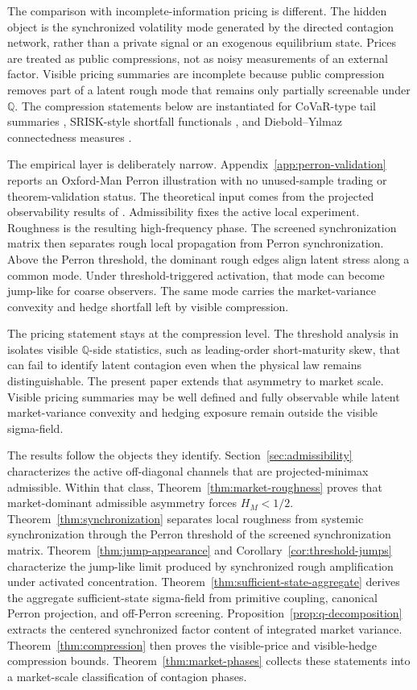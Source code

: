 \documentclass[11pt,a4paper]{amsart}
\theoremstyle{plain}
\theoremstyle{definition}
\theoremstyle{remark}
\newcommand{\QQ}{\mathbb{Q}}
\begin{document}
The comparison with incomplete-information pricing is different.  The hidden object is the
synchronized volatility mode generated by the directed contagion network, rather than a private
signal or an exogenous equilibrium state.  Prices are treated as public compressions, not as noisy
measurements of an external factor.  Visible pricing summaries are incomplete because public
compression removes part of a latent rough mode that remains only partially screenable under
\(\QQ\).  The compression statements
below are instantiated for CoVaR-type tail summaries \cite{adrian2016covar}, SRISK-style shortfall
functionals \cite{brownlees2017srisk}, and Diebold--Y\i lmaz connectedness measures
\cite{diebold2009spillovers,diebold2014connectedness}.

The empirical layer is deliberately narrow.  Appendix~\ref{app:perron-validation} reports an
Oxford-Man Perron illustration with no unused-sample trading or theorem-validation status.  The
theoretical input comes from the projected observability results of \cite{vidal2026econometric}.  Admissibility fixes the active local experiment.  Roughness is the
resulting high-frequency phase.  The screened synchronization matrix then separates rough local
propagation from Perron synchronization.  Above the Perron threshold, the dominant rough edges align
latent stress along a common mode.  Under threshold-triggered activation, that mode can become
jump-like for coarse observers.  The same mode carries the market-variance convexity and hedge
shortfall left by visible compression.

The pricing statement stays at the compression level.  The threshold analysis in
\cite{vidal2026latent} isolates visible \(\QQ\)-side statistics, such as leading-order
short-maturity skew, that can fail to identify latent contagion even when the physical law remains
distinguishable.  The present paper extends that asymmetry to market scale.  Visible pricing
summaries may be well defined and fully observable while latent market-variance convexity and
hedging exposure remain outside the visible sigma-field.

The results follow the objects they identify.  Section~\ref{sec:admissibility} characterizes the
active off-diagonal channels that are projected-minimax admissible.  Within that class,
Theorem~\ref{thm:market-roughness} proves that market-dominant admissible asymmetry forces
\(H_M<1/2\).  Theorem~\ref{thm:synchronization} separates local roughness from systemic
synchronization through the Perron threshold of the screened synchronization matrix.
Theorem~\ref{thm:jump-appearance} and Corollary~\ref{cor:threshold-jumps} characterize the
jump-like limit produced by synchronized rough amplification under activated concentration.
Theorem~\ref{thm:sufficient-state-aggregate} derives the aggregate sufficient-state sigma-field
from primitive coupling, canonical Perron projection, and off-Perron screening.
Proposition~\ref{prop:q-decomposition} extracts the centered synchronized factor content of
integrated market variance.  Theorem~\ref{thm:compression} then proves the visible-price and
visible-hedge compression bounds.  Theorem~\ref{thm:market-phases} collects these statements into a
market-scale classification of contagion phases.
\end{document}
